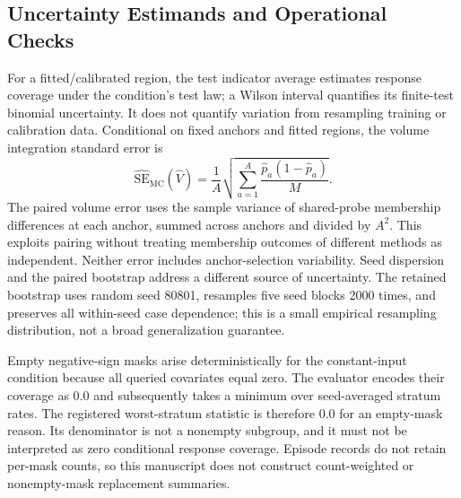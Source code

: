 \documentclass{article}
\begin{document}
{\subsection{Uncertainty Estimands and Operational Checks}
For a fitted/calibrated region, the test indicator average estimates response coverage under the condition's test law; a Wilson interval quantifies its finite-test binomial uncertainty. It does not quantify variation from resampling training or calibration data. Conditional on fixed anchors and fitted regions, the volume integration standard error is
\begin{equation}
 \widehat{\mathrm{SE}}_{\mathrm{MC}}(\widehat V)
 =\frac1A\sqrt{\sum_{a=1}^A\frac{\widehat p_a(1-\widehat p_a)}{M}}.
\end{equation}
The paired volume error uses the sample variance of shared-probe membership differences at each anchor, summed across anchors and divided by $A^2$. This exploits pairing without treating membership outcomes of different methods as independent. Neither error includes anchor-selection variability. Seed dispersion and the paired bootstrap address a different source of uncertainty. The retained bootstrap uses random seed 80801, resamples five seed blocks 2000 times, and preserves all within-seed case dependence; this is a small empirical resampling distribution, not a broad generalization guarantee.

Empty negative-sign masks arise deterministically for the constant-input condition because all queried covariates equal zero. The evaluator encodes their coverage as $0.0$ and subsequently takes a minimum over seed-averaged stratum rates. The registered worst-stratum statistic is therefore $0.0$ for an empty-mask reason. Its denominator is not a nonempty subgroup, and it must not be interpreted as zero conditional response coverage. Episode records do not retain per-mask counts, so this manuscript does not construct count-weighted or nonempty-mask replacement summaries.

}
\end{document}
